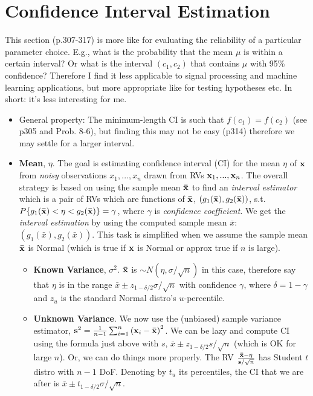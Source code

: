 \documentclass[a4paper]{book}
\begin{document}
\section{Confidence Interval Estimation}
This section (p.307-317) is more like for evaluating the reliability of a particular parameter choice. E.g., what is the probability that the mean $\mu$ is within a certain interval? Or what is the interval $(c_1, c_2)$ that contains $\mu$ with 95\% confidence? Therefore I find it less applicable to signal processing and machine learning applications, but more appropriate like for testing hypotheses etc. In short: it's less interesting for me.

\begin{itemize}
\item General property: The minimum-length CI is such that $f(c_1)=f(c_2)$ (see p305 and Prob. 8-6), but finding this may not be easy (p314) therefore we may settle for a larger interval.
\item \textbf{Mean}, $\eta$. The goal is estimating confidence interval (CI) for the mean $\eta$ of $\mathbf{x}$ from \textit{noisy} observations $x_1, ..., x_n$ drawn from RVs $\mathbf{x}_1, ..., \mathbf{x}_n$. The overall strategy is based on using the sample mean $\mathbf{\bar{x}}$ to find an \textit{interval estimator} which is a pair of RVs which are functions of $\mathbf{\bar{x}}$, $\left(g_1(\mathbf{\bar{x}}), g_2(\mathbf{\bar{x}})\right)$, s.t. $P\{g_1(\mathbf{\bar{x}}) < \eta < g_2(\mathbf{\bar{x}})\}=\gamma$, where $\gamma$ is \textit{confidence coefficient}. We get the \textit{interval estimation} by using the computed sample mean $\bar{x}$: $\left(g_1(\bar{x}), g_2(\bar{x})\right)$. This task is simplified when we assume the sample mean $\mathbf{\bar{x}}$ is Normal (which is true if $\mathbf{x}$ is Normal or approx true if $n$ is large).
	\begin{itemize}
	\item \textbf{Known Variance}, $\sigma^2$. $\mathbf{\bar{x}}$ is $\sim N(\eta,\sigma/\sqrt{n})$ in this case, therefore say that $\eta$ is in the range $\bar{x}\pm z_{1-\delta/2} \sigma/\sqrt{n}$  with confidence $\gamma$, where $\delta = 1-\gamma$ and $z_u$ is the standard Normal distro's $u$-percentile.
	\item \textbf{Unknown Variance}. We now use the (unbiased) sample variance estimator, $\mathbf{s}^2=\frac{1}{n-1}\sum_{i=1}^{n}\left(\mathbf{x}_i-\mathbf{\bar{x}}\right)^2$. We can be lazy and compute CI using the formula just above with $s$, \ie $\bar{x}\pm z_{1-\delta/2} s/\sqrt{n}$ (which is OK for large $n$). Or, we can do things more properly. The RV $\frac{\mathbf{\bar{x}}-\eta}{\mathbf{s}/\sqrt{n}}$ has Student $t$ distro with $n-1$ DoF. Denoting by $t_u$ its percentiles, the CI that we are after is $\bar{x}\pm t_{1-\delta/2} \sigma/\sqrt{n}$.

\end{itemize}
\end{itemize}
\end{document}
